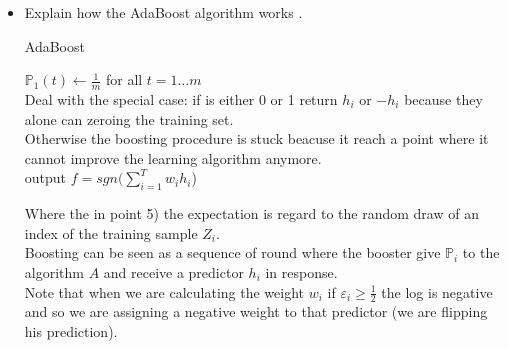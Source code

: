 \begin{itemize}
    \newpage
    \item Explain how the AdaBoost algorithm works  .\\
        
        \begin{algorithm}[H]
            \SetAlgoLined
            \DontPrintSemicolon
            \caption{AdaBoost}
            $\mathbb{P}_1(t) \leftarrow \frac{1}{m}$ for all $t = 1 \dots m$\\
             {
                Deal with the special case: if is either 0 or 1 return $h_i$ or $-h_i$ because they alone can zeroing the training set.\\
                Otherwise the boosting procedure is stuck beacuse it reach a point where it cannot improve the learning algorithm anymore.\\
            } 
        \uElse output {$f = sgn(\sum_{i=1}^T w_i h_i$})
        \end{algorithm}

        Where the in point 5) the expectation is regard to the random draw of an index of the training sample $Z_i$.\\ 
        Boosting can be seen as a sequence of round where the booster give $\mathbb{P}_i$ to the algorithm $A$ and receive a predictor $h_i$ in response.\\
        Note that when we are calculating the weight $w_i$ if $\varepsilon_i \geq \frac{1}{2}$ the log is negative and so we are assigning a negative weight to that predictor (we are flipping his prediction).\\ 
        

\end{itemize}
